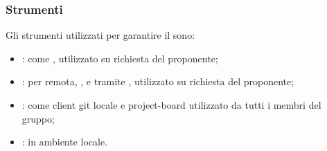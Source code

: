     \subsubsection{Strumenti}
    Gli strumenti utilizzati per garantire il  sono:
    \begin{itemize}
        \item \textbf{}: come , utilizzato su richiesta del proponente;
        \item \textbf{}: per  remota, ,  e  tramite , utilizzato su richiesta del proponente;
        \item \textbf{}: come client git locale e project-board utilizzato da tutti i membri del gruppo;
        \item \textbf{}:  in ambiente locale.
    \end{itemize}